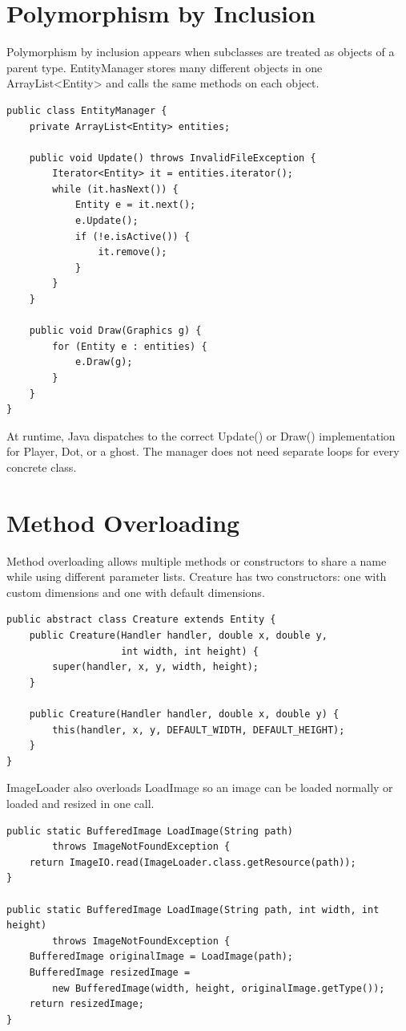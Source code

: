 \documentclass[12pt,a4paper]{article}
\begin{document}
\section*{Polymorphism by Inclusion}
Polymorphism by inclusion appears when subclasses are treated as objects of a parent type. EntityManager stores many different objects in one ArrayList<Entity> and calls the same methods on each object.

\begin{lstlisting}
public class EntityManager {
    private ArrayList<Entity> entities;

    public void Update() throws InvalidFileException {
        Iterator<Entity> it = entities.iterator();
        while (it.hasNext()) {
            Entity e = it.next();
            e.Update();
            if (!e.isActive()) {
                it.remove();
            }
        }
    }

    public void Draw(Graphics g) {
        for (Entity e : entities) {
            e.Draw(g);
        }
    }
}
\end{lstlisting}

At runtime, Java dispatches to the correct Update() or Draw() implementation for Player, Dot, or a ghost. The manager does not need separate loops for every concrete class.


\section*{Method Overloading}
Method overloading allows multiple methods or constructors to share a name while using different parameter lists. Creature has two constructors: one with custom dimensions and one with default dimensions.

\begin{lstlisting}
public abstract class Creature extends Entity {
    public Creature(Handler handler, double x, double y,
                    int width, int height) {
        super(handler, x, y, width, height);
    }

    public Creature(Handler handler, double x, double y) {
        this(handler, x, y, DEFAULT_WIDTH, DEFAULT_HEIGHT);
    }
}
\end{lstlisting}

ImageLoader also overloads LoadImage so an image can be loaded normally or loaded and resized in one call.

\begin{lstlisting}
public static BufferedImage LoadImage(String path)
        throws ImageNotFoundException {
    return ImageIO.read(ImageLoader.class.getResource(path));
}

public static BufferedImage LoadImage(String path, int width, int height)
        throws ImageNotFoundException {
    BufferedImage originalImage = LoadImage(path);
    BufferedImage resizedImage =
        new BufferedImage(width, height, originalImage.getType());
    return resizedImage;
}
\end{lstlisting}
\end{document}
